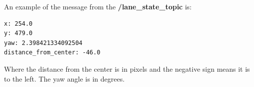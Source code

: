 \documentclass[12pt]{article}
\begin{document}
An example of the message from the \textbf{/lane\_state\_topic}  is:

\begin{lstlisting}[language=csh]
x: 254.0
y: 479.0
yaw: 2.398421334092504
distance_from_center: -46.0
\end{lstlisting}

Where the distance from the center is in pixels and the negative sign means it is to the left. The yaw angle is in degrees.
\end{document}
